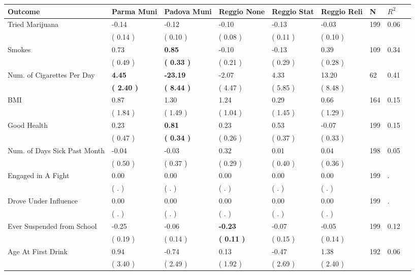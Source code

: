 \begin{tabular}{L{6.2cm} C{1.8cm} C{1.8cm} C{1.8cm} C{1.8cm} C{1.8cm} C{1.8cm} C{0.3cm} C{0.3cm}}
\toprule
 \textbf{Outcome} & \textbf{Parma Muni} & \textbf{Padova Muni} & \textbf{Reggio None} & \textbf{Reggio Stat} & \textbf{Reggio Reli} & \textbf{N} & \textbf{$ R^2$} \\
\midrule
Tried Marijuana &     -0.14 &     -0.12 &     -0.10 &     -0.13 &     -0.03  & 199 &       0.06 \\ 
 & (     0.14 ) & (     0.10 ) & (     0.08 ) & (     0.11 ) & (     0.10 )  & \\
Smokes &      0.73 & \textbf{     0.85} &     -0.10 &     -0.13 &      0.39  & 109 &       0.34 \\ 
 & (     0.49 ) & \textbf{(     0.33 )} & (     0.21 ) & (     0.29 ) & (     0.28 )  & \\
Num. of Cigarettes Per Day & \textbf{     4.45} & \textbf{   -23.19} &     -2.07 &      4.33 &     13.20  & 62 &       0.41 \\ 
 & \textbf{(     2.40 )} & \textbf{(     8.44 )} & (     4.47 ) & (     5.85 ) & (     8.48 )  & \\
BMI &      0.87 &      1.30 &      1.24 &      0.29 &      0.66  & 164 &       0.15 \\ 
 & (     1.84 ) & (     1.49 ) & (     1.04 ) & (     1.45 ) & (     1.29 )  & \\
Good Health &      0.23 & \textbf{     0.81} &      0.23 &      0.53 &     -0.07  & 199 &       0.15 \\ 
 & (     0.47 ) & \textbf{(     0.34 )} & (     0.26 ) & (     0.37 ) & (     0.33 )  & \\
Num. of Days Sick Past Month &     -0.04 &     -0.03 &      0.32 &      0.01 &      0.04  & 198 &       0.05 \\ 
 & (     0.50 ) & (     0.37 ) & (     0.29 ) & (     0.40 ) & (     0.36 )  & \\
Engaged in A Fight &      0.00 &      0.00 &      0.00 &      0.00 &      0.00  & 199 &          . \\ 
 & (        . ) & (        . ) & (        . ) & (        . ) & (        . )  & \\
Drove Under Influence &      0.00 &      0.00 &      0.00 &      0.00 &      0.00  & 199 &          . \\ 
 & (        . ) & (        . ) & (        . ) & (        . ) & (        . )  & \\
Ever Suspended from School &     -0.25 &     -0.06 & \textbf{    -0.23} &     -0.07 &     -0.05  & 199 &       0.12 \\ 
 & (     0.19 ) & (     0.14 ) & \textbf{(     0.11 )} & (     0.15 ) & (     0.14 )  & \\
Age At First Drink &      0.94 &     -0.74 &      0.13 &     -0.47 &      1.38  & 192 &       0.06 \\ 
 & (     3.40 ) & (     2.49 ) & (     1.92 ) & (     2.69 ) & (     2.40 )  & \\
\bottomrule
\end{tabular}
